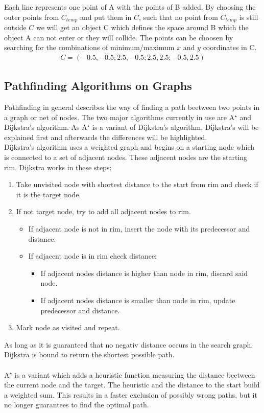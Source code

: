 Each line represents one point of A with the points of B added. By choosing the outer points from $C_{temp}$ and put them in $C$, such that no point from $C_{temp}$ is still outside $C$  we will get an object C which defines the space around B which the object A can not enter or they will collide. The points can be choosen by searching for the combinations of minimum/maximum $x$ and $y$ coordinates in C.
\begin{align*}
C = (-0.5, -0.5; 2.5, -0.5; 2.5, 2.5; -0.5, 2.5)
\end{align*}

\subsection{Pathfinding Algorithms on Graphs}
Pathfinding in general describes the way of finding a path beetween two points in a graph or net of nodes. The two major algorithms currently in use are A$^\star$ and Dijkstra's algorithm. As A$^\star$ is a variant of Dijkstra's algorithm, Dijkstra's will be explained first and afterwards the differences will be highlighted.\\
Dijkstra's algorithm uses a weighted graph and begins on a starting node which is connected to a set of adjacent nodes. These adjacent nodes are the starting rim.
Dijkstra works in these steps:
\begin{enumerate}
\item Take unvisited node with shortest distance to the start from rim and check if it is the target node.
\item If not target node, try to add all adjacent nodes to rim.
\begin{itemize}
\item If adjacent node is not in rim, insert the node with its predecessor and distance.
\item If adjacent node is in rim check distance:
\begin{itemize}
\item If adjacent nodes distance is higher than node in rim, discard said node.
\item If adjacent nodes distance is smaller than node in rim, update predecessor and distance.
\end{itemize}
\end{itemize}
\item Mark node as visited and repeat.
\end{enumerate} 
As long as it is guaranteed that no negativ distance occurs in the search graph, Dijkstra is bound to return the shortest possible path.\\\\
A$^\star$ is a variant which adds a heuristic function measuring the distance beetween the current node and the target. The heuristic and the distance to the start build a weighted sum. This results in a faster exclusion of possibly wrong paths, but it no longer guarantees to find the optimal path.